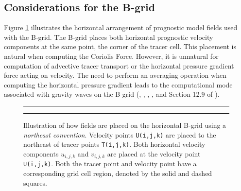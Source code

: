 \subsection{Considerations for the B-grid}
\label{subsection:b-grid-richardson-number}

Figure \ref{fig:b-grid} illustrates the horizontal arrangement of
prognostic model fields used with the B-grid. The B-grid places both
horizontal prognostic velocity components at the same point, the
corner of the tracer cell.  This placement is natural when computing
the Coriolis Force.  However, it is unnatural for computation of
advective tracer transport or the horizontal pressure gradient force
acting on velocity.  The need to perform an averaging operation when
computing the horizontal pressure gradient leads to the computational
mode associated with gravity waves on the B-grid (\cite{Mesinger1973},
\cite{KillworthFreesurf1991}, \cite{MOM3manual},
\cite{GriffiesPacSchmidtBalaji2001}, and Section 12.9 of
\cite{SMGbook}).

\begin{figure}
\rule{\textwidth}{0.005in}
\begin{center}
\caption[Placement of fields onto the B-grid] {Illustration of how
  fields are placed on the horizontal B-grid using a {\it northeast
    convention}.  Velocity points {\tt U(i,j,k)} are placed to the
  northeast of tracer points {\tt T(i,j,k)}.  Both horizontal velocity
  components $u_{i,j,k}$ and $v_{i,j,k}$ are placed at the velocity
  point {\tt U(i,j,k)}.  Both the tracer point and velocity point have
  a corresponding grid cell region, denoted by the solid and dashed
  squares.}
\label{fig:b-grid}
\end{center}
\rule{\textwidth}{0.005in}
\end{figure}

